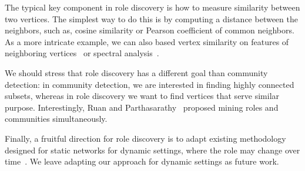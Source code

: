 The typical key component in role discovery is how to measure similarity
between two vertices. The simplest way to do this is by computing a distance
between the neighbors, such as, cosine similarity or Pearson coefficient of
common neighbors.  As a more intricate example, we can also based vertex
similarity on features of neighboring vertices~\cite{yang2015network} or
spectral analysis~\cite{tsourakakis2014toward}.


We should stress that role discovery has a different goal than community
detection: in community detection, we are interested in finding highly
connected subsets, whereas in role discovery we want to find vertices that
serve similar purpose. Interestingly, Ruan and Parthasarathy~\cite{ruan2014simultaneous}
proposed mining roles and communities simultaneously.

Finally, a fruitful direction for role discovery is to adapt existing
methodology designed for static networks for dynamic settings, where the role
may change over time~\cite{abnar2015ssrm,li2013learning}. We leave adapting
our approach for dynamic settings as future work.

